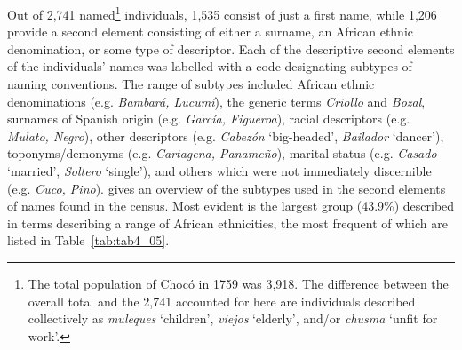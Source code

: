 \documentclass[output=paper,colorlinks,citecolor=brown]{langscibook}
\begin{document}
Out of 2,741 named\footnote{The total population of Chocó in 1759 was 3,918. The difference between the overall total and the 2,741 accounted for here are individuals described collectively as \emph{muleques} ‘children’, \emph{viejos} ‘elderly’, and/or \emph{chusma} ‘unfit for work’.} individuals, 1,535 consist of just a first name, while 1,206 provide a second element consisting of either a surname, an African ethnic denomination, or some type of descriptor. Each of the descriptive second elements of the individuals’ names was labelled with a code designating subtypes of naming conventions. The range of subtypes included African ethnic denominations (e.g. \emph{Bambará, Lucumí}), the generic terms \emph{Criollo} and \emph{Bozal}, surnames of Spanish origin (e.g. \emph{García, Figueroa}), racial descriptors (e.g. \emph{Mulato, Negro}), other descriptors (e.g. \emph{Cabezón} ‘big-headed’, \emph{Bailador} ‘dancer’), toponyms/demonyms (e.g. \emph{Cartagena, Panameño}), marital status (e.g. \emph{Casado} ‘married’, \emph{Soltero} ‘single’), and others which were not immediately discernible (e.g. \emph{Cuco, Pino}).  gives an overview of the subtypes used in the second elements of names found in the census. Most evident is the largest group (43.9\%) described in terms describing a range of African ethnicities, the most frequent of which are listed in Table~\ref{tab:tab4_05}.
\end{document}
